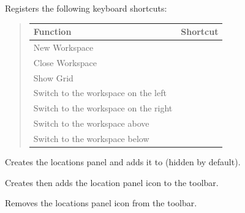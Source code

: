 \documentclass[letterpaper,10pt,openany]{sphinxmanual}
\begin{document}
\begin{fulllineitems}
\begin{fulllineitems}
\begin{fulllineitems}
Registers the following keyboard shortcuts:
\begin{quote}

\begin{tabulary}{\linewidth}{|L|L|}
\hline
\textsf{\relax 
Function
} & \textsf{\relax 
Shortcut
}\\
\hline
New Workspace
 & 
\\
\hline
Close Workspace
 & 
\\
\hline
Show Grid
 & 
\\
\hline
Switch to the workspace on the left
 & 
\\
\hline
Switch to the workspace on the right
 & 
\\
\hline
Switch to the workspace above
 & 
\\
\hline
Switch to the workspace below
 & 
\\
\hline\end{tabulary}

\end{quote}

\end{fulllineitems}



\begin{fulllineitems}
\label{Developer/js_gateone:GateOne.Visual.locationsPanel}
Creates the locations panel and adds it to  (hidden by default).

\end{fulllineitems}



\begin{fulllineitems}
\label{Developer/js_gateone:GateOne.Visual.showLocationsIcon}
Creates then adds the location panel icon to the toolbar.

\end{fulllineitems}



\begin{fulllineitems}
Removes the locations panel icon from the toolbar.

\end{fulllineitems}




\end{fulllineitems}
\end{fulllineitems}
\end{document}
